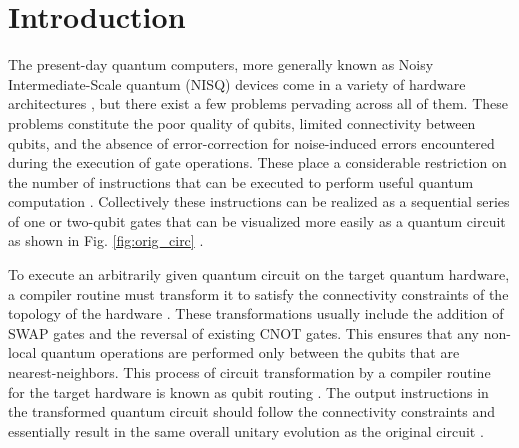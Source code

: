 \documentclass[%
 reprint,
amsmath,amssymb,
pra,
]{revtex4-2}
\begin{document}
\maketitle


\section{\label{sec:intro}Introduction}

The present-day quantum computers, more generally known as Noisy Intermediate-Scale quantum (NISQ) devices \citep{nisq_preskill} come in a variety of hardware architectures \cite{IBMQ, hardware_sycamore, hardware_rigetti_aspen, hardware_xanadu}, but there exist a few problems pervading across all of them. These problems constitute the poor quality of qubits, limited connectivity between qubits, and the absence of error-correction for noise-induced errors encountered during the execution of gate operations. These place a considerable restriction on the number of instructions that can be executed to perform useful quantum computation \cite{nisq_preskill}. Collectively these instructions can be realized as a sequential series of one or two-qubit gates that can be visualized more easily as a quantum circuit as shown in Fig. \ref{fig:orig_circ} \citep{others_childs}.

To execute an arbitrarily given quantum circuit on the target quantum hardware, a compiler routine must transform it to satisfy the connectivity constraints of the topology of the hardware \citep{qroute_tket}. These transformations usually include the addition of SWAP gates and the reversal of existing CNOT gates. This ensures that any non-local quantum operations are performed only between the qubits that are nearest-neighbors. This process of circuit transformation by a compiler routine for the target hardware is known as qubit routing \citep{qroute_tket}. The output instructions in the transformed quantum circuit should follow the connectivity constraints and essentially result in the same overall unitary evolution as the original circuit \citep{qroute_dqn2}.
\end{document}
